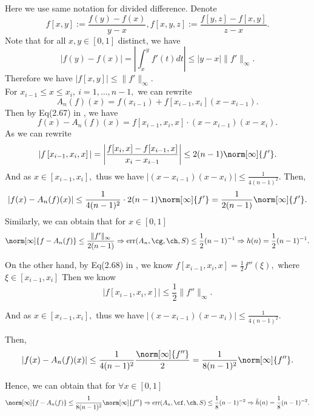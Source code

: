 Here we use same notation for divided difference. Denote
$$f[x,y]:=\frac{f(y)-f(x)}{y-x},f[x,y,z]:=\frac{f[y,z]-f[x,y]}{z-x}.$$
Note that for all $x,y \in [0,1]$ distinct, we have
 $$|f(y)-f(x)|=\left|\int_{x}^{y}f'(t)dt\right| \leq |y-x|\|f'\|_{\infty}.$$
 Therefore we have $|f[x,y]|\leq \|f'\|_{\infty}.$\\
For $x_{i-1} \leq x \leq x_i, \ i=1, \ldots, n-1,$ we  can rewrite
$$A_{n}(f)(x)=f\left(x_{i-1}\right)+f\left[x_{i-1},x_{i}\right]\left(x-x_{i-1}\right).$$
Then by Eq(2.67) in \cite{walter}, we have
$$
f(x)-A_{n}(f)(x)
=f\left[x_{i-1},x_{i},x\right]\cdot (x-x_{i-1})(x-x_i).
$$
As we can rewrite
$$|f\left[x_{i-1},x_{i},x\right]|=\left|\frac{f[x_{i},x]-f[x_{i-1},x]}{x_i-x_{i-1}}\right|\leq2(n-1)\norm[\infty]{f'}.$$
And as $x \in \left[x_{i-1},x_{i} \right],$ thus we have
$\left|(x-x_{i-1})(x-x_{i})\right| \leq \frac{1}{4(n-1)^2}.$
Then,
$$
|f(x)-A_{n}(f)(x)|\leq \frac{1}{4(n-1)^2}\cdot 2(n-1)\norm[\infty]{f'}=\frac{1}{2(n-1)}\norm[\infty]{f'}.
$$
Similarly, we can obtain that for $x \in [0,1]$
$$\norm[\infty]{f-A_{n}(f)} \leq \frac{\|f'\|_{\infty}}{2(n-1)} \Rightarrow \err(A_n,\cg,\ch,S) \leq \frac{1}{2}(n-1)^{-1} \Rightarrow h(n)=\frac{1}{2}(n-1)^{-1}.$$

On the other hand, by Eq(2.68) in \cite{walter},
we know
$f\left[x_{i-1},x_{i},x\right]=\frac{1}{2}f''(\xi),$ where $\xi \in [x_{i-1},x_{i}]$
Then we know
$$
|f\left[x_{i-1},x_{i},x\right] |\leq \frac{1}{2}\|f''\|_{\infty}.$$

And as $x \in \left[x_{i-1},x_{i} \right],$ thus we have
$\left|(x-x_{i-1})(x-x_{i})\right| \leq \frac{1}{4(n-1)^2}.$

Then,
$$
|f(x)-A_{n}(f)(x)|\leq \frac{1}{4(n-1)^2}\frac{\norm[\infty]{f''}}{2}=\frac{1}{8(n-1)^2}\norm[\infty]{f''}.
$$

Hence, we can obtain that for $\forall x \in [0,1]$
$$\norm[\infty]{f-A_{n}(f)} \leq  \frac{1}{8(n-1)^{2}}\norm[\infty]{f''} \Rightarrow \err(A_n,\cf,\ch,S) \leq \frac{1}{8}(n-1)^{-2}
\Rightarrow \tilde{h}(n)=\frac{1}{8}(n-1)^{-2}.$$




